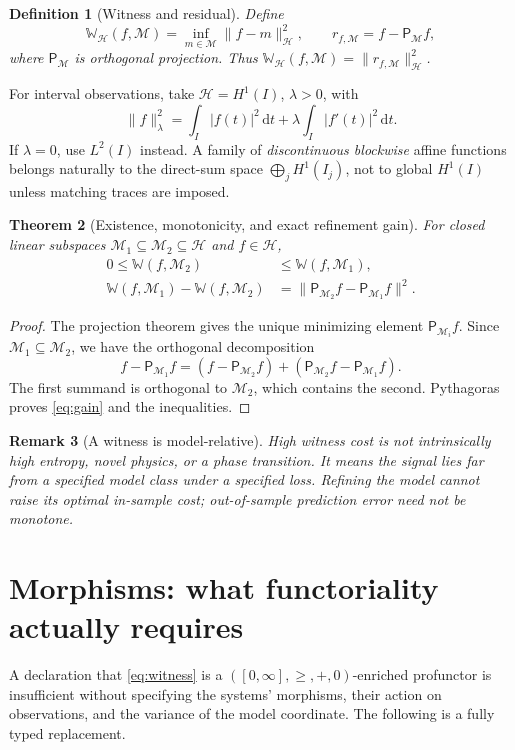 \documentclass[11pt,letterpaper]{article}
\newtheorem{theorem}{Theorem}[section]
\newtheorem{definition}[theorem]{Definition}
\newtheorem{remark}[theorem]{Remark}
\newcommand{\HH}{\mathcal H}
\newcommand{\MM}{\mathcal M}
\newcommand{\WW}{\mathbb W}
\newcommand{\PP}{\mathsf P}
\newcommand{\dd}{\,\mathrm d}
\begin{document}
\begin{definition}[Witness and residual]
Define
\begin{equation}\label{eq:witness}
\WW_{\HH}(f,\MM)=\inf_{m\in\MM}\|f-m\|_{\HH}^2,
\qquad r_{f,\MM}=f-\PP_{\MM}f,
\end{equation}
where $\PP_\MM$ is orthogonal projection. Thus $\WW_{\HH}(f,\MM)=\|r_{f,\MM}\|_{\HH}^2$.
\end{definition}

For interval observations, take $\HH=H^1(I)$, $\lambda>0$, with
\[
\|f\|_\lambda^2=\int_I|f(t)|^2\dd t+\lambda\int_I|f'(t)|^2\dd t.
\]
If $\lambda=0$, use $L^2(I)$ instead. A family of \emph{discontinuous blockwise} affine functions belongs naturally to the direct-sum space $\bigoplus_jH^1(I_j)$, not to global $H^1(I)$ unless matching traces are imposed.

\begin{theorem}[Existence, monotonicity, and exact refinement gain]\label{thm:refine}
For closed linear subspaces $\MM_1\subseteq\MM_2\subseteq\HH$ and $f\in\HH$,
\begin{align}
0\le\WW(f,\MM_2)&\le\WW(f,\MM_1),\\
\WW(f,\MM_1)-\WW(f,\MM_2)&=\|\PP_{\MM_2}f-\PP_{\MM_1}f\|^2.\label{eq:gain}
\end{align}
\end{theorem}
\begin{proof}
The projection theorem gives the unique minimizing element $\PP_{\MM_i}f$. Since $\MM_1\subseteq\MM_2$, we have the orthogonal decomposition
\[
f-\PP_{\MM_1}f=(f-\PP_{\MM_2}f)+(\PP_{\MM_2}f-\PP_{\MM_1}f).
\]
The first summand is orthogonal to $\MM_2$, which contains the second. Pythagoras proves \eqref{eq:gain} and the inequalities.
\end{proof}

\begin{remark}[A witness is model-relative]
High witness cost is not intrinsically high entropy, novel physics, or a phase transition. It means the signal lies far from a \emph{specified} model class under a \emph{specified} loss. Refining the model cannot raise its optimal in-sample cost; out-of-sample prediction error need not be monotone.
\end{remark}

\section{Morphisms: what functoriality actually requires}
A declaration that \eqref{eq:witness} is a $([0,\infty],\ge,+,0)$-enriched profunctor is insufficient without specifying the systems' morphisms, their action on observations, and the variance of the model coordinate. The following is a fully typed replacement.
\end{document}
